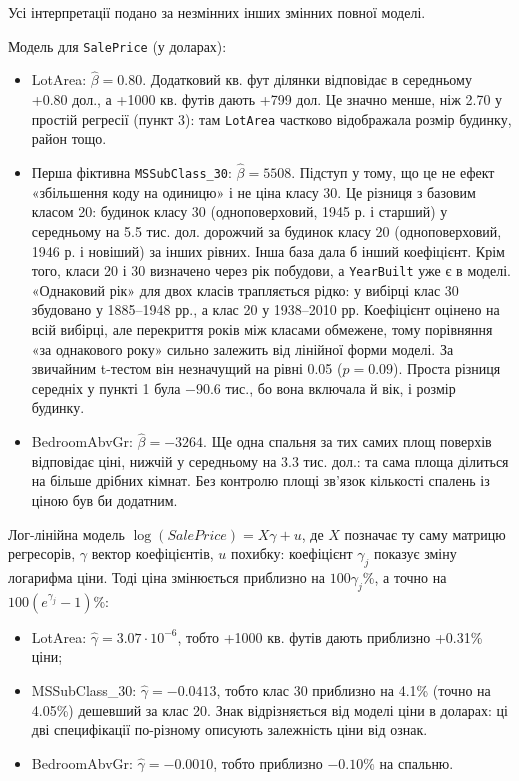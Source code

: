 \answerheading
Усі інтерпретації подано за незмінних інших змінних повної моделі.

Модель для \texttt{SalePrice} (у доларах):

\begin{itemize}
\item
  LotArea: \(\widehat\beta=0.80\). Додатковий кв. фут ділянки відповідає
  в середньому +0.80 дол., а +1000 кв. футів дають +799 дол. Це значно
  менше, ніж 2.70 у простій регресії (пункт 3): там \texttt{LotArea}
  частково відображала розмір будинку, район тощо.
\item
  Перша фіктивна \texttt{MSSubClass\_30}: \(\widehat\beta=5508\).
  Підступ у тому, що це не ефект «збільшення коду на одиницю» і не ціна
  класу 30. Це різниця з базовим класом 20: будинок класу 30
  (одноповерховий, 1945 р. і старший) у середньому на 5.5 тис. дол.
  дорожчий за будинок класу 20 (одноповерховий, 1946 р. і новіший) за
  інших рівних. Інша база дала б інший коефіцієнт. Крім того, класи 20 і
  30 визначено через рік побудови, а \texttt{YearBuilt} уже є в моделі.
  «Однаковий рік» для двох класів трапляється рідко: у вибірці клас 30
  збудовано у 1885--1948 рр., а клас 20 у 1938--2010 рр. Коефіцієнт
  оцінено на всій вибірці, але перекриття років між класами обмежене,
  тому порівняння «за однакового року» сильно залежить від лінійної
  форми моделі. За звичайним t-тестом він незначущий на рівні 0.05
  (\(p=0.09\)). Проста різниця середніх у пункті 1 була \(-90.6\) тис.,
  бо вона включала й вік, і розмір будинку.
\item
  BedroomAbvGr: \(\widehat\beta=-3264\). Ще одна спальня за тих самих
  площ поверхів відповідає ціні, нижчій у середньому на 3.3 тис. дол.:
  та сама площа ділиться на більше дрібних кімнат. Без контролю площі
  зв'язок кількості спалень із ціною був би додатним.
\end{itemize}

Лог-лінійна модель \(\log(SalePrice)=X\gamma+u\), де \(X\) позначає ту
саму матрицю регресорів, \(\gamma\) вектор коефіцієнтів, \(u\) похибку:
коефіцієнт \(\gamma_j\) показує зміну логарифма ціни. Тоді ціна
змінюється приблизно на \(100\gamma_j\%\), а точно на
\(100(e^{\gamma_j}-1)\%\):

\begin{itemize}
\item
  LotArea: \(\widehat\gamma=3.07\cdot10^{-6}\), тобто +1000 кв. футів
  дають приблизно +0.31\% ціни;
\item
  MSSubClass\_30: \(\widehat\gamma=-0.0413\), тобто клас 30 приблизно на
  4.1\% (точно на 4.05\%) дешевший за клас 20. Знак відрізняється від
  моделі ціни в доларах: ці дві специфікації по-різному описують
  залежність ціни від ознак.
\item
  BedroomAbvGr: \(\widehat\gamma=-0.0010\), тобто приблизно \(-0.10\%\)
  на спальню.
\end{itemize}

